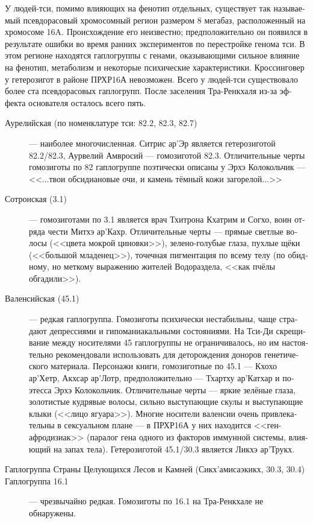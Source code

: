 \documentclass[a4paper,12pt,fleqn]{book}\usepackage{cooltooltips}\usepackage{polyglossia}\setdefaultlanguage[babelshorthands=true]{russian}\setotherlanguage{english}\defaultfontfeatures{Ligatures=TeX,Mapping=tex-text} \usepackage{xcolor}\definecolor{lightgray}{HTML}{bbbbbb}\color{lightgray}\newcommand{\ml}[3]{\textenglish{\textcolor{black}{#3}}}
\begin{document}
У людей-тси, помимо влияющих на фенотип отдельных, существует так называемый псевдорасовый хромосомный регион размером 8 мегабаз, расположенный на хромосоме 16A.
Происхождение его неизвестно;
предположительно он появился в результате ошибки во время ранних экспериментов по перестройке генома тси.
В этом регионе находятся гаплогруппы с генами, оказывающими сильное влияние на фенотип, метаболизм и некоторые психические характеристики.
Кроссинговер у гетерозигот в районе ПРХР16А невозможен.
Всего у людей-тси существовало более ста псевдорасовых гаплогрупп.
После заселения Тра-Ренкхаля из-за эффекта основателя осталось всего пять.

\begin{description}
\item[Аурелийская (по номенклатуре тси: 82.2, 82.3, 82.7)] --- наиболее многочисленная.
Ситрис ар'Эр является гетерозиготой 82.2/82.3, Аурвелий Амвросий --- гомозиготой 82.3.
Отличительные черты гомозиготы по 82 гаплогруппе поэтически описаны у Эрхэ Колокольчик --- <<...твои обсидиановые очи, и камень тёмный кожи загорелой...>>
\item[Сотронская (3.1)] --- гомозиготами по 3.1 является врач Тхитрона Кхатрим и Согхо, воин отряда чести Митхэ ар'Кахр.
Отличительные черты --- прямые светлые волосы (<<цвета мокрой циновки>>), зелено-голубые глаза, пухлые щёки (<<большой младенец>>), точечная пигментация по всему телу (по обидному, но меткому выражению жителей Водораздела, <<как пчёлы обгадили>>).
\item[Валенсийская (45.1)] --- редкая гаплогруппа.
Гомозиготы психически нестабильны, чаще страдают депрессиями и гипоманиакальными состояниями.
На Тси-Ди скрещивание между носителями 45 гаплогруппы не ограничивалось, но им настоятельно рекомендовали использовать для деторождения доноров генетического материала.
Персонажи книги, гомозиготные по 45.1 --- Кхохо ар'Хетр, Акхсар ар'Лотр, предположительно --- Тхартху ар'Катхар и поэтесса Эрхэ Колокольчик.
Отличительные черты --- яркие зелёные глаза, золотистые кудрявые волосы, сильно выступающие скулы и выступающие клыки (<<лицо ягуара>>).
Многие носители валенсии очень привлекательны в сексуальном плане --- в ПРХР16А у них находится <<ген-афродизиак>> (паралог гена одного из факторов иммунной системы, влияющий на запах тела).
Гетерозиготой 45.1/30.3 является Ликхэ ар'Трукх.
\item[Гаплогруппа Страны Целующихся Лесов и Камней (Сикх'амисаэкикх, 30.3, 30.4)]
\item[Гаплогруппа 16.1] --- чрезвычайно редкая.
Гомозиготы по 16.1 на Тра-Ренкхале не обнаружены.
\end{description}
\end{document}
